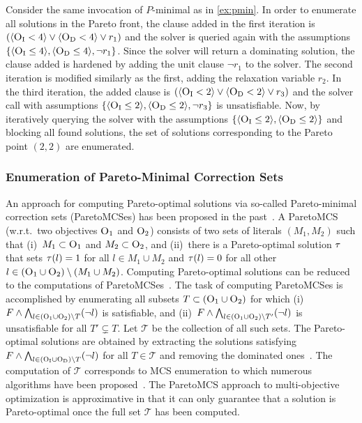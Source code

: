 \begin{example}
  Consider the same invocation of $P$-minimal as in \cref{ex:pmin}.
  In order to enumerate all solutions in the Pareto front, the clause added in the first iteration is $(\langle \textsc{O}_{\text{I}} < 4 \rangle \lor \langle \textsc{O}_{\text{D}} < 4 \rangle \lor r_1)$ and the solver is queried again with the assumptions $\{ \langle \textsc{O}_{\text{I}} \leq 4 \rangle, \langle \textsc{O}_{\text{D}} \leq 4 \rangle, \lnot r_1 \}$.
  Since the solver will return a dominating solution, the clause added is hardened by adding the unit clause $\lnot r_1$ to the solver.
  The second iteration is modified similarly as the first, adding the relaxation variable $r_2$.
  In the third iteration, the added clause is $(\langle \textsc{O}_{\text{I}} < 2 \rangle \lor \langle \textsc{O}_{\text{D}} < 2 \rangle \lor r_3)$ and the solver call with assumptions $\{ \langle \textsc{O}_{\text{I}} \leq 2 \rangle, \langle \textsc{O}_{\text{D}} \leq 2 \rangle, \lnot r_3 \}$ is unsatisfiable.
  Now, by iteratively querying the solver with the assumptions $\{ \langle \textsc{O}_{\text{I}} \leq 2 \rangle, \langle \textsc{O}_{\text{D}} \leq 2 \rangle \}$ and blocking all found solutions, the set of solutions corresponding to the Pareto point $(2,2)$ are enumerated.
\end{example}

\subsubsection{Enumeration of Pareto-Minimal Correction Sets\label{sec:pareto-mcs}}

An approach for computing Pareto-optimal solutions via so-called Pareto-minimal correction sets (ParetoMCSes) has been proposed in the past~\autocite{DBLP:conf/ijcai/Terra-NevesLM18a,DBLP:conf/aaai/Terra-NevesLM18,DBLP:conf/ijcai/Terra-NevesLM18}.
A ParetoMCS (w.r.t.\ two objectives $\textsc{O}_1$ and $\textsc{O}_2$) consists of two sets of literals $(M_1, M_2)$ such that (i)~$M_1 \subset \textsc{O}_1$ and $M_2 \subset \textsc{O}_2$, and (ii)~there is a Pareto-optimal solution $\tau$ that sets $\tau(l) = 1$ for all $l \in M_1 \cup M_2$ and $\tau(l) = 0$ for all other $l \in (\textsc{O}_1 \cup \textsc{O}_2) \setminus (M_1 \cup M_2)$.
Computing Pareto-optimal solutions can be reduced to the computations of ParetoMCSes~\autocite{DBLP:conf/ijcai/Terra-NevesLM18a}.
The task of computing ParetoMCSes is accomplished by enumerating all subsets $T \subset  (\textsc{O}_1 \cup \textsc{O}_2)$ for which (i)~$F \land \bigwedge_{l \in  (\textsc{O}_1 \cup \textsc{O}_2) \setminus T} (\lnot l)$ is satisfiable, and (ii)~$F \land \bigwedge_{l \in  (\textsc{O}_1 \cup \textsc{O}_2) \setminus T'} (\lnot l)$ is unsatisfiable for all $T' \subsetneq T$.
Let $\mathcal{T}$ be the collection of all such sets.
The Pareto-optimal solutions are obtained by extracting the solutions satisfying $F \land \bigwedge_{l \in  (\textsc{O}_{\text{I}} \cup \textsc{O}_{\text{D}}) \setminus T} (\lnot l)$ for all $T \in \mathcal{T}$ and removing the dominated ones~\autocite{DBLP:conf/ijcai/Terra-NevesLM18a}.
The computation of $\mathcal{T}$ corresponds to MCS enumeration to which numerous algorithms have been proposed~\autocites{DBLP:conf/lpar/BendikC20,DBLP:conf/hvc/MorgadoLM12,DBLP:conf/sat/PrevitiMJM17}.
The ParetoMCS approach to multi-objective optimization is approximative in that it can only guarantee that a solution is Pareto-optimal once the full set $\mathcal{T}$ has been computed.

